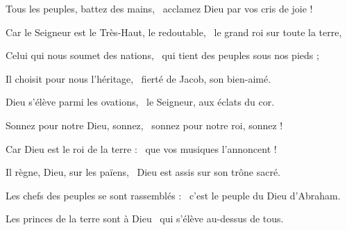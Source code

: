 \item Tous les peuples, battez des mains,~\psstar{} acclamez Dieu par vos cris de joie !
\item Car le Seigneur est le Très-Haut, le redoutable,~\psstar{} le grand roi sur toute la terre,
\item Celui qui nous soumet des nations,~\psstar{} qui tient des peuples sous nos pieds ;
\item Il choisit pour nous l'héritage,~\psstar{} fierté de Jacob, son bien-aimé.
\item Dieu s'élève parmi les ovations,~\psstar{} le Seigneur, aux éclats du cor.
\item Sonnez pour notre Dieu, sonnez,~\psstar{} sonnez pour notre roi, sonnez !
\item Car Dieu est le roi de la terre :~\psstar{} que vos musiques l'annoncent !
\item Il règne, Dieu, sur les païens,~\psstar{} Dieu est assis sur son trône sacré.
\item Les chefs des peuples se sont rassemblés :~\psstar{} c'est le peuple du Dieu d'Abraham.
\item Les princes de la terre sont à Dieu~\psstar{} qui s'élève au-dessus de tous.
